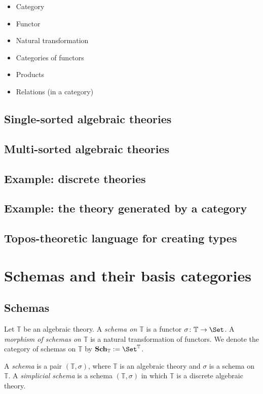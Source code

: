 \documentclass{amsart}
\def\TT{{\mathbb T}}
\def\Sch{{\bf Sch}}
\begin{document}
\begin{itemize}

\item Category
\item Functor
\item Natural transformation
\item Categories of functors
\item Products
\item Relations (in a category)

\end{itemize}

\subsection{Single-sorted algebraic theories}

\subsection{Multi-sorted algebraic theories}

\subsection{Example: discrete theories}

\subsection{Example: the theory generated by a category}

\subsection{Topos-theoretic language for creating types}

\section{Schemas and their basis categories}

\subsection{Schemas}

\begin{definition}

Let $\TT$ be an algebraic theory.  A {\em schema on $\TT$} is a functor $\sigma\taking\TT\to\Set$.  A {\em morphism of schemas on $\TT$} is a natural transformation of functors.  We denote the category of schemas on $\TT$ by $\Sch_\TT:=\Set^\TT$.

A {\em schema} is a pair $(\TT,\sigma)$, where $\TT$ is an algebraic theory and $\sigma$ is a schema on $\TT$.  A {\em simplicial schema} is a schema $(\TT,\sigma)$ in which $\TT$ is a discrete algebraic theory.

\end{definition}
\end{document}
